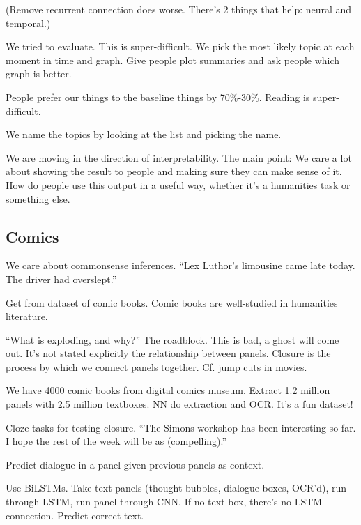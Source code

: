 (Remove recurrent connection does worse. There's 2 things that help: neural and temporal.)

We tried to evaluate. This is super-difficult. We pick the most likely topic at each moment in time and graph. 
Give people plot summaries and ask people which graph is better.

People prefer our things to the baseline things by 70\%-30\%. Reading is super-difficult. 

We name the topics by looking at the list and picking the name.


We are moving in the direction of interpretability.
The main point: We care a lot about showing the result to people and making sure they can make sense of it. How do people use this output in a useful way, whether it's a humanities task or something else.
%

\subsection{Comics}

We care about commonsense inferences. ``Lex Luthor's limousine came late today. The driver had overslept.'' 

Get from dataset of comic books. Comic books are well-studied in humanities literature. 

``What is exploding, and why?'' The roadblock. This is bad, a ghost will come out. It's not stated explicitly the relationship between panels.
Closure is the process by which we connect panels together. Cf. jump cuts in movies.

We have 4000 comic books from digital comics museum. Extract 1.2 million panels with 2.5 million textboxes. NN do extraction and OCR. It's a fun dataset!

Cloze tasks for testing closure. ``The Simons workshop has been interesting so far. I hope the rest of the week will be as (compelling).''

Predict dialogue in a panel given previous panels as context.

Use BiLSTMs. Take text panels (thought bubbles, dialogue boxes, OCR'd), run through LSTM, run panel through CNN. If no text box, there's no LSTM connection. Predict correct text.

